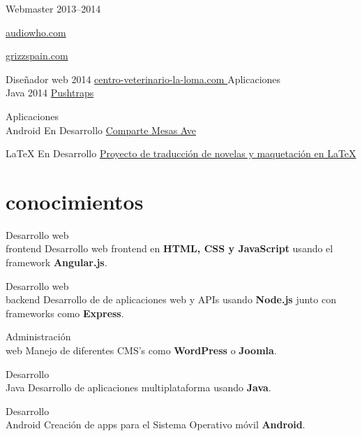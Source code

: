 \documentclass[hidelinks]{friggeri-cv} %
\begin{document}
\begin{entrylist}
\entry
{Webmaster}
{}
{2013--2014}
{
\href{http://bit.ly/1EkBjUB}{audiowho.com \hspace{0.5em} \faLink}

\href{http://bit.ly/1EJiCHz}{grizzspain.com \hspace{0.5em} \faLink}
}
\entry
{Diseñador web}
{}
{2014}
{
\href{http://bit.ly/1JqdhYn}{centro-veterinario-la-loma.com \hspace{0.5em} \faLink}
}
\entry
{Aplicaciones \\ Java}
{}
{2014}
{
\href{http://bit.ly/18gBD9M}{Pushtraps \hspace{0.5em} \faLink}
}

\entry
{Aplicaciones \\ Android}
{}
{En Desarrollo}
{
\href{http://bit.ly/18gBdjQ}{Comparte Mesas Ave \hspace{0.5em} \faLink}
}

\entry
{\LaTeX}
{}
{En Desarrollo}
{
\href{http://bit.ly/1C2wIWs}{Proyecto de traducción de novelas y
maquetación en \LaTeX \hspace{0.5em} \faLink}
}

\end{entrylist}


\section{conocimientos}

\begin{entrylist}
\entry
{Desarrollo web \\ frontend}
{}
{}
{Desarrollo web frontend en \textbf{HTML, CSS y JavaScript} usando el framework
\textbf{Angular.js}.}

\entry
{Desarrollo web  \\ backend}
{}
{}
{Desarrollo de  de aplicaciones web y APIs usando \textbf{Node.js} junto con
frameworks como \textbf{Express}.}

\entry
{Administración \\ web}
{}
{}
{Manejo de diferentes CMS's como \textbf{WordPress} o \textbf{Joomla}.}

\entry
{Desarrollo \\ Java}
{}
{}
{Desarrollo de aplicaciones multiplataforma usando \textbf{Java}.}

\entry
{Desarrollo \\ Android}
{}
{}
{Creación de apps para el Sistema Operativo móvil \textbf{Android}.}

\end{entrylist}
\end{document}
